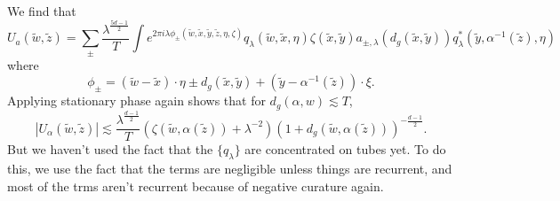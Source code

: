 \documentclass{article}
\DeclareMathOperator{\RR}{\mathbf{R}}
\theoremstyle{plain}
\theoremstyle{remark}
\theoremstyle{definition}
\begin{document}
We find that
%
\[ U_a(\tilde{w},\tilde{z}) = \sum_{\pm} \frac{\lambda^{\frac{5d-1}{2}}}{T} \int e^{2 \pi i \lambda \phi_{\pm}(\tilde{w}, \tilde{x}, \tilde{y}, \tilde{z}, \eta, \zeta)} q_\lambda(\tilde{w}, \tilde{x}, \eta) \zeta(\tilde{x}, \tilde{y}) a_{\pm, \lambda}(d_g(\tilde{x}, \tilde{y})) q_\lambda^*(\tilde{y}, \alpha^{-1}(\tilde{z}), \eta) \]
%
where
%
\[ \phi_{\pm} = (\tilde{w} - \tilde{x}) \cdot \eta \pm d_g(\tilde{x}, \tilde{y}) + (\tilde{y} - \alpha^{-1}(\tilde{z})) \cdot \xi. \]
%
Applying stationary phase again shows that for $d_g(\alpha,w) \lesssim T$,
%
\[ |U_\alpha(\tilde{w},\tilde{z})| \lesssim \frac{\lambda^{\frac{d-1}{2}}}{T} (\zeta(\tilde{w}, \alpha(\tilde{z})) + \lambda^{-2}) (1 + d_g(\tilde{w}, \alpha(\tilde{z})))^{- \frac{d-1}{2}}. \]
%
But we haven't used the fact that the $\{ q_\lambda \}$ are concentrated on tubes yet. To do this, we use the fact that the terms are negligible unless things are recurrent, and most of the trms aren't recurrent because of negative curature again.


%
%
\end{document}
